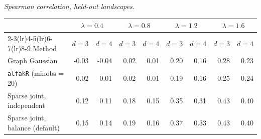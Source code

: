 \par\medskip\noindent\begin{minipage}{\linewidth}
\textit{Spearman correlation, held-out landscapes.}
\begin{center}
\footnotesize
\setlength{\tabcolsep}{3.5pt}
\begin{tabular}{l*{8}{r}}
\toprule
 & \multicolumn{2}{c}{$\lambda=0.4$} & \multicolumn{2}{c}{$\lambda=0.8$} & \multicolumn{2}{c}{$\lambda=1.2$} & \multicolumn{2}{c}{$\lambda=1.6$} \\
\cmidrule(lr){2-3}\cmidrule(lr){4-5}\cmidrule(lr){6-7}\cmidrule(lr){8-9}
Method & $d=3$ & $d=4$ & $d=3$ & $d=4$ & $d=3$ & $d=4$ & $d=3$ & $d=4$ \\
\midrule
Graph Gaussian & -0.03 & -0.04 & 0.02 & 0.01 & 0.20 & 0.16 & 0.28 & 0.23 \\
\texttt{alfakR} (minobs = 20) & 0.02 & 0.01 & 0.02 & 0.01 & 0.19 & 0.16 & 0.25 & 0.24 \\
Sparse joint, independent & 0.12 & 0.11 & 0.18 & 0.15 & 0.35 & 0.31 & 0.43 & 0.40 \\
Sparse joint, balance (default) & 0.15 & 0.14 & 0.19 & 0.16 & 0.37 & 0.33 & 0.43 & 0.40 \\
\bottomrule
\end{tabular}
\end{center}
\end{minipage}
